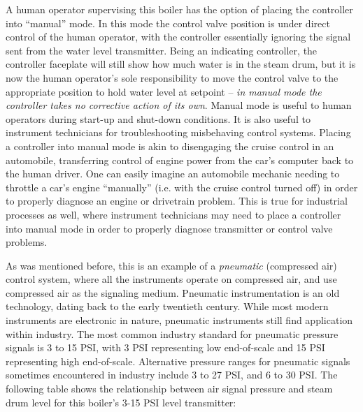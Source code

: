 \vskip 10pt

A human operator supervising this boiler has the option of placing the controller into ``manual'' mode.  In this mode the control valve position is under direct control of the human operator, with the controller essentially ignoring the signal sent from the water level transmitter.  Being an indicating controller, the controller faceplate will still show how much water is in the steam drum, but it is now the human operator's sole responsibility to move the control valve to the appropriate position to hold water level at setpoint -- \textit{in manual mode the controller takes no corrective action of its own}.  Manual mode is useful to human operators during start-up and shut-down conditions.  It is also useful to instrument technicians for troubleshooting misbehaving control systems.  Placing a controller into manual mode is akin to disengaging the cruise control in an automobile, transferring control of engine power from the car's computer back to the human driver.  One can easily imagine an automobile mechanic needing to throttle a car's engine ``manually'' (i.e. with the cruise control turned off) in order to properly diagnose an engine or drivetrain problem.  This is true for industrial processes as well, where instrument technicians may need to place a controller into manual mode in order to properly diagnose transmitter or control valve problems.

\vskip 10pt

\filbreak

As was mentioned before, this is an example of a \textit{pneumatic} (compressed air) control system, where all the instruments operate on compressed air, and use compressed air as the signaling medium.  Pneumatic instrumentation is an old technology, dating back to the early twentieth century.  While most modern instruments are electronic in nature, pneumatic instruments still find application within industry.  The most common industry standard for pneumatic pressure signals is 3 to 15 PSI, with 3 PSI representing low end-of-scale and 15 PSI representing high end-of-scale.  Alternative pressure ranges for pneumatic signals sometimes encountered in industry include 3 to 27 PSI, and 6 to 30 PSI.  The following table shows the relationship between air signal pressure and steam drum level for this boiler's 3-15 PSI level transmitter: 


